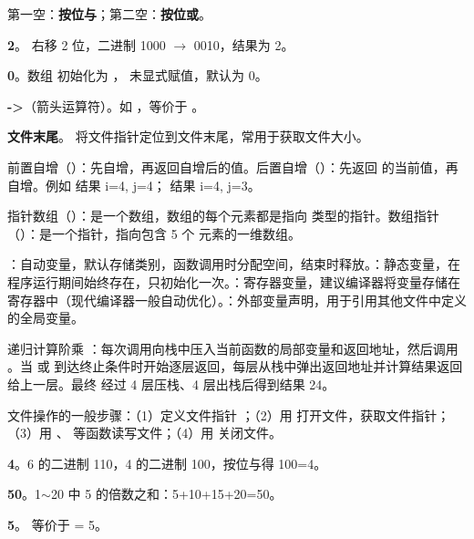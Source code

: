 \documentclass[a4paper,11pt]{article}
\begin{document}
\examtitle



\q 第一空：\textbf{按位与}；第二空：\textbf{按位或}。

\q \textbf{2}。 右移 2 位，二进制 1000 $\rightarrow$ 0010，结果为 2。

\q \textbf{0}。数组  初始化为 ， 未显式赋值，默认为 0。

\q \textbf{->}（箭头运算符）。如 ，等价于 。

\q \textbf{文件末尾}。 将文件指针定位到文件末尾，常用于获取文件大小。


\q 前置自增（）：先自增，再返回自增后的值。后置自增（）：先返回  的当前值，再自增。例如  结果 i=4, j=4； 结果 i=4, j=3。

\q 指针数组（）：是一个数组，数组的每个元素都是指向  类型的指针。数组指针（）：是一个指针，指向包含 5 个  元素的一维数组。

\q {}：自动变量，默认存储类别，函数调用时分配空间，结束时释放。：静态变量，在程序运行期间始终存在，只初始化一次。：寄存器变量，建议编译器将变量存储在寄存器中（现代编译器一般自动优化）。：外部变量声明，用于引用其他文件中定义的全局变量。

\q 递归计算阶乘 ：每次调用向栈中压入当前函数的局部变量和返回地址，然后调用 。当  或  到达终止条件时开始逐层返回，每层从栈中弹出返回地址并计算结果返回给上一层。最终  经过 4 层压栈、4 层出栈后得到结果 24。

\q 文件操作的一般步骤：（1）定义文件指针 ；（2）用  打开文件，获取文件指针；（3）用 、 等函数读写文件；（4）用  关闭文件。


\q \textbf{4}。6 的二进制 110，4 的二进制 100，按位与得 100=4。

\q \textbf{50}。1$\sim$20 中 5 的倍数之和：5+10+15+20=50。

\q \textbf{5}。 等价于  = 5。
\end{document}

